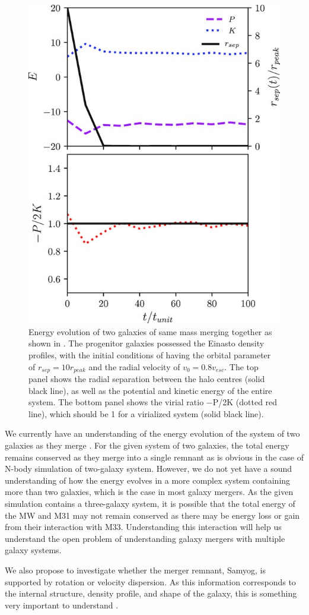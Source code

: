 \documentclass[twocolumn]{aastex631}
\begin{document}
\begin{figure}[htbp]
\includegraphics[width=.5\textwidth]{two_galaxy_merger.jpg}
\caption{Energy evolution of two galaxies of same mass merging together as shown in \citep{same_mass_merger_1}. The progenitor galaxies possessed the Einasto density profiles, with the initial conditions of having the orbital parameter of $r_{sep} = 10 r_{peak}$ and the radial velocity of $v_{0}=0.8v_{esc}$. The top panel shows the radial separation between the halo centres (solid black line), as well as the potential and kinetic energy of the entire system. The bottom panel shows the virial ratio −P/2K (dotted red line), which should be 1 for a virialized system (solid black line).\label{fig:virial}}
\end{figure}

We currently have an understanding of the energy evolution of the system of two galaxies as they merge \citep[e.g.][]{same_mass_merger_1, same_mass_merger_2}. For the given system of two galaxies, the total energy remains conserved as they merge into a single remnant \citep{same_mass_merger_1} as is obvious in the case of N-body simulation of two-galaxy system. However, we do not yet have a sound understanding of how the energy evolves in a more complex system containing more than two galaxies, which is the case in most galaxy mergers. As the given simulation contains a three-galaxy system, it is possible that the total energy of the MW and M31 may not remain conserved as there may be energy loss or gain from their interaction with M33. Understanding this interaction will help us understand the open problem of understanding galaxy mergers with multiple galaxy systems. 

We also propose to investigate whether the merger remnant, Samyog, is supported by rotation or velocity dispersion. As this information corresponds to the internal structure, density profile, and shape of the galaxy, this is something very important to understand \cite{same_mass_merger_1, same_mass_merger_2}. 
\end{document}
